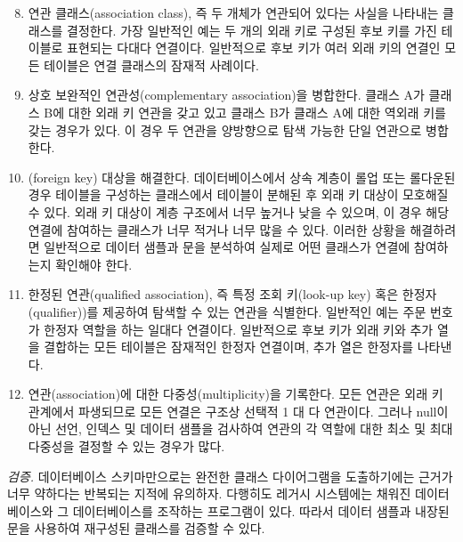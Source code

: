 \documentclass[a4paper,10pt,twoside]{book}
\begin{document}
\begin{enumerate}\setcounter{enumi}{7}
  \item 연관 클래스(association class), 즉 두 개체가 연관되어 있다는 사실을 나타내는 클래스를 결정한다. 가장 일반적인 예는 두 개의 외래 키로 구성된 후보 키를 가진 테이블로 표현되는 다대다 연결이다. 일반적으로 후보 키가 여러 외래 키의 연결인 모든 테이블은 연결 클래스의 잠재적 사례이다.

  \item 상호 보완적인 연관성(complementary association)을 병합한다. 클래스 A가 클래스 B에 대한 외래 키 연관을 갖고 있고 클래스 B가 클래스 A에 대한 역외래 키를 갖는 경우가 있다. 이 경우 두 연관을 양방향으로 탐색 가능한 단일 연관으로 병합한다.

  \item {}(foreign key) 대상을 해결한다. 데이터베이스에서 상속 계층이 롤업 또는 롤다운된 경우 테이블을 구성하는 클래스에서 테이블이 분해된 후 외래 키 대상이 모호해질 수 있다. 외래 키 대상이 계층 구조에서 너무 높거나 낮을 수 있으며, 이 경우 해당 연결에 참여하는 클래스가 너무 적거나 너무 많을 수 있다. 이러한 상황을 해결하려면 일반적으로 데이터 샘플과  문을 분석하여 실제로 어떤 클래스가 연결에 참여하는지 확인해야 한다.

  \item 한정된 연관(qualified association), 즉 특정 조회 키(look-up key) 혹은 한정자(qualifier))를 제공하여 탐색할 수 있는 연관을 식별한다. 일반적인 예는 주문 번호가 한정자 역할을 하는 일대다 연결이다. 일반적으로 후보 키가 외래 키와 추가 열을 결합하는 모든 테이블은 잠재적인 한정자 연결이며, 추가 열은 한정자를 나타낸다.

  \item 연관(association)에 대한 다중성(multiplicity)을 기록한다. 모든 연관은 외래 키 관계에서 파생되므로 모든 연결은 구조상 선택적 1 대 다 연관이다. 그러나 null이 아닌 선언, 인덱스 및 데이터 샘플을 검사하여 연관의 각 역할에 대한 최소 및 최대 다중성을 결정할 수 있는 경우가 많다.

\end{enumerate}

\noindent
\emph{검증.}
데이터베이스 스키마만으로는 완전한 클래스 다이어그램을 도출하기에는 근거가 너무 약하다는 반복되는 지적에 유의하자. 다행히도 레거시 시스템에는 채워진 데이터베이스와 그 데이터베이스를 조작하는 프로그램이 있다. 따라서 데이터 샘플과 내장된  문을 사용하여 재구성된 클래스를 검증할 수 있다.
\end{document}
